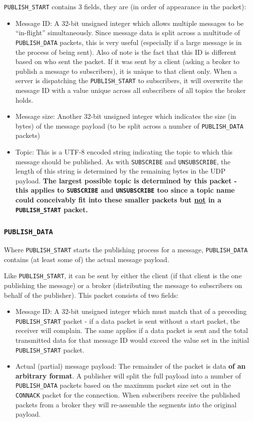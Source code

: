 \documentclass[a4paper]{article}
\numberwithin{figure}{section}
\numberwithin{table}{section}
\newcommand{\mi}{\mintinline}
\begin{document}
\mi{c}{PUBLISH_START} contains 3 fields, they are (in order of appearance in the packet):
\begin{itemize}
	\item Message ID: A 32-bit unsigned integer which allows multiple messages to be ``in-flight'' simultaneously. Since message data is split across a multitude of \mi{c}{PUBLISH_DATA} packets, this is very useful (especially if a large message is in the process of being sent). Also of note is the fact that this ID is different based on who sent the packet. If it was sent by a client (asking a broker to publish a message to subscribers), it is unique to that client only. When a server is dispatching the \mi{c}{PUBLISH_START} to subscribers, it will overwrite the message ID with a value unique across all subscribers of all topics the broker holds.
	\item Message size: Another 32-bit unsigned integer which indicates the size (in bytes) of the message payload (to be split across a number of \mi{c}{PUBLISH_DATA} packets)
	\item Topic: This is a UTF-8 encoded string indicating the topic to which this message should be published. As with \mi{c}{SUBSCRIBE} and \mi{c}{UNSUBSCRIBE}, the length of this string is determined by the remaining bytes in the UDP payload. \textbf{The largest possible topic is determined by this packet - this applies to \mi{c}{SUBSCRIBE} and \mi{c}{UNSUBSCRIBE} too since a topic name could conceivably fit into these smaller packets but \underline{not} in a \mi{c}{PUBLISH_START} packet.}
\end{itemize}

\subsubsection{\mi{c}{PUBLISH_DATA}}
Where \mi{c}{PUBLISH_START} starts the publishing process for a message, \mi{c}{PUBLISH_DATA} contains (at least some of) the actual message payload.

Like \mi{c}{PUBLISH_START}, it can be sent by either the client (if that client is the one publishing the message) or a broker (distributing the message to subscribers on behalf of the publisher). This packet consists of two fields:
\begin{itemize}
	\item Message ID: A 32-bit unsigned integer which must match that of a preceding \mi{c}{PUBLISH_START} packet - if a data packet is sent without a start packet, the receiver will complain. The same applies if a data packet is sent and the total transmitted data for that message ID would exceed the value set in the initial \mi{c}{PUBLISH_START} packet.
	\item Actual (partial) message payload: The remainder of the packet is data \textbf{of an arbitrary format}. A publisher will split the full payload into a number of \mi{c}{PUBLISH_DATA} packets based on the maximum packet size set out in the \mi{c}{CONNACK} packet for the connection. When subscribers receive the published packets from a broker they will re-assemble the segments into the original payload.
\end{itemize}
\end{document}
